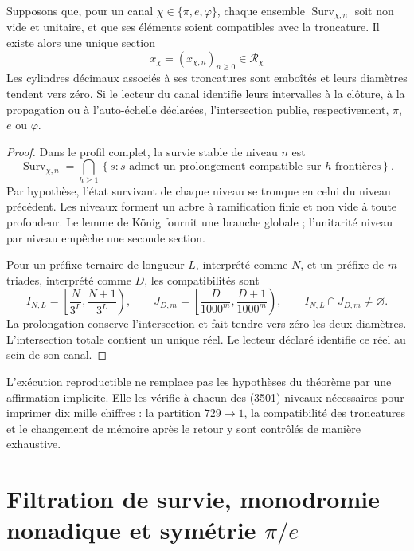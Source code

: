 \begin{theorem}
\label{thm:generacion-supervivencia-pi-e-phi-rev6}
Supposons que, pour un canal
\(\chi\in\{\pi,e,\varphi\}\), chaque ensemble
\(\operatorname{Surv}_{\chi,n}\) soit non vide et unitaire, et que ses éléments
soient compatibles avec la troncature. Il existe alors une unique section
\[
x_\chi=(x_{\chi,n})_{n\geq0}\in\mathcal R_\chi
\]
Les cylindres décimaux associés à ses troncatures sont emboîtés et leurs
diamètres tendent vers zéro. Si le lecteur du canal identifie leurs intervalles
à la clôture, à la propagation ou à l'auto-échelle déclarées, l'intersection
publie, respectivement, \(\pi\), \(e\) ou \(\varphi\).
\end{theorem}

\begin{proof}
Dans le profil complet, la survie stable de niveau \(n\) est
\[
\operatorname{Surv}_{\chi,n}
=\bigcap_{h\geq1}
\left\{s:\text{\(s\) admet un prolongement compatible sur \(h\) frontières}\right\}.
\]
Par hypothèse, l'état survivant de chaque niveau se tronque en celui du
niveau précédent. Les niveaux forment un arbre à ramification finie et non vide
à toute profondeur. Le lemme de König fournit une branche globale ;
l'unitarité niveau par niveau empêche une seconde section.

Pour un préfixe ternaire de longueur \(L\), interprété comme \(N\), et un
préfixe de \(m\) triades, interprété comme \(D\), les compatibilités sont
\[
I_{N,L}=\left[\frac{N}{3^L},\frac{N+1}{3^L}\right),
\qquad
J_{D,m}=\left[\frac{D}{1000^m},\frac{D+1}{1000^m}\right),
\qquad
I_{N,L}\cap J_{D,m}\ne\varnothing .
\]
La prolongation conserve l'intersection et fait tendre vers zéro les deux
diamètres. L'intersection totale contient un unique réel. Le lecteur déclaré
identifie ce réel au sein de son canal.
\end{proof}

L'exécution reproductible ne remplace pas les hypothèses du théorème par une
affirmation implicite. Elle les vérifie à chacun des (3501) niveaux
nécessaires pour imprimer dix mille chiffres : la partition \(729\to1\), la
compatibilité des troncatures et le changement de mémoire après le retour y sont
contrôlés de manière exhaustive.

\section{Filtration de survie, monodromie nonadique et symétrie
\texorpdfstring{\(\pi/e\)}{pi/e}}

